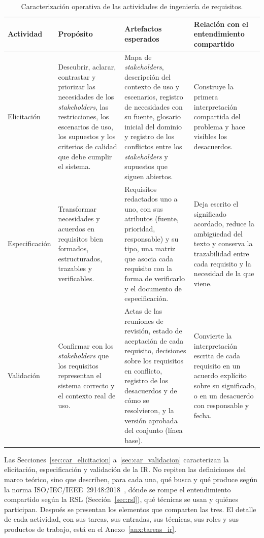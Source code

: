 \documentclass[12pt,letterpaper,oneside]{report}
\begin{document}
\begin{table}[H]
\caption{Caracterización operativa de las actividades de ingeniería de requisitos.}
\label{tab:re_characterization}
\centering
\footnotesize
\renewcommand{\arraystretch}{1.15}
\begin{tabularx}{\textwidth}{@{}L{2.3cm}L{3.0cm}Y Y@{}}
\toprule
\textbf{Actividad} & \textbf{Propósito} & \textbf{Artefactos esperados} &
\textbf{Relación con el entendimiento compartido} \\
\midrule
Elicitación &
Descubrir, aclarar, contrastar y priorizar las necesidades de los
\textit{stakeholders}, las restricciones, los escenarios de uso, los supuestos y
los criterios de calidad que debe cumplir el sistema. &
Mapa de \textit{stakeholders}, descripción del contexto de uso y escenarios,
registro de necesidades con su fuente, glosario inicial del dominio y registro
de los conflictos entre los \textit{stakeholders} y supuestos que siguen abiertos. &
Construye la primera interpretación compartida del problema y hace visibles los
desacuerdos. \\
\midrule
Especificación &
Transformar necesidades y acuerdos en requisitos bien formados, estructurados,
trazables y verificables. &
Requisitos redactados uno a uno, con sus atributos (fuente, prioridad,
responsable) y su tipo, una matriz que asocia cada requisito con la forma de
verificarlo y el documento de especificación. &
Deja escrito el significado acordado, reduce la ambigüedad del texto y conserva
la trazabilidad entre cada requisito y la necesidad de la que viene. \\
\midrule
Validación &
Confirmar con los \textit{stakeholders} que los requisitos representan el
sistema correcto y el contexto real de uso. &
Actas de las reuniones de revisión, estado de aceptación de cada requisito,
decisiones sobre los requisitos en conflicto, registro de los desacuerdos y de
cómo se resolvieron, y la versión aprobada del conjunto (línea base). &
Convierte la interpretación escrita de cada requisito en un acuerdo explícito
sobre su significado, o en un desacuerdo con responsable y fecha. \\
\bottomrule
\end{tabularx}
\end{table}

Las Secciones~\ref{sec:car_elicitacion} a~\ref{sec:car_validacion} caracterizan
la elicitación, especificación y validación de la IR. No repiten las
definiciones del marco teórico, sino que describen, para cada una, qué busca y
qué produce según la norma ISO/IEC/IEEE~29148:2018~\cite{iso29148}, dónde se
rompe el entendimiento compartido según la RSL (Sección~\ref{sec:rsl}), qué
técnicas se usan y quiénes participan. Después se presentan los elementos que
comparten las tres. El detalle de cada actividad, con sus tareas, sus entradas,
sus técnicas, sus roles y sus productos de trabajo, está en el
Anexo~\ref{anx:tareas_ir}.
\end{document}
